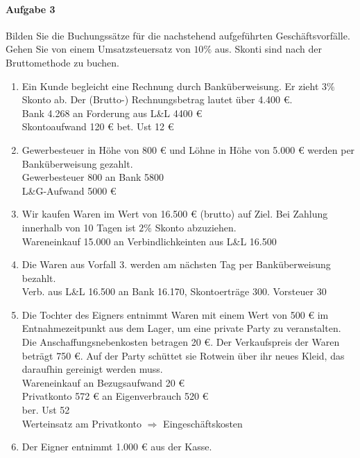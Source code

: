 \documentclass[paper=a4, fontsize=11pt]{scrartcl}
\numberwithin{equation}{section}
\numberwithin{figure}{section}
\numberwithin{table}{section}
\begin{document}
\paragraph{Aufgabe 3}
Bilden Sie die Buchungssätze für die nachstehend aufgeführten Geschäftsvorfälle. Gehen Sie von einem Umsatzsteuersatz von $10 \%$ aus. Skonti sind nach der Bruttomethode zu buchen. \\
\begin{enumerate}
\item Ein Kunde begleicht eine Rechnung durch Banküberweisung. Er zieht $3 \%$ Skonto ab. Der  (Brutto-) Rechnungsbetrag lautet über 4.400 €. \\

Bank 4.268 an Forderung aus L\&L 4400 € \\
Skontoaufwand 120 €
bet. Ust 12 €
\item Gewerbesteuer in Höhe von 800 € und Löhne in Höhe von 5.000 € werden per Banküberweisung gezahlt. \\

Gewerbesteuer 800 an Bank 5800 \\
L\&G-Aufwand 5000 €
\item Wir kaufen Waren im Wert von 16.500 € (brutto) auf Ziel. Bei Zahlung innerhalb von 10 Tagen ist $2\%$ Skonto abzuziehen. \\

Wareneinkauf 15.000 an Verbindlichkeinten aus L\&L 16.500
\item Die Waren aus Vorfall 3. werden am nächsten Tag per Banküberweisung bezahlt. \\

Verb. aus L\&L 16.500 an Bank 16.170, Skontoerträge 300. Vorsteuer 30
\item Die Tochter des Eigners entnimmt Waren mit einem Wert von 500 € im Entnahmezeitpunkt aus dem Lager, um eine private Party zu veranstalten. Die Anschaffungsnebenkosten betragen 20 €. Der Verkaufspreis der Waren beträgt 750 €. Auf der Party schüttet sie Rotwein über ihr neues Kleid, das daraufhin gereinigt werden muss. \\

Wareneinkauf an Bezugsaufwand 20 € \\
Privatkonto 572 € an Eigenverbrauch 520 € \\
ber. Ust 52 \\
Werteinsatz am Privatkonto $\Rightarrow$ Eingeschäftskosten
\item Der Eigner entnimmt 1.000 € aus der Kasse. \\


\end{enumerate}
\end{document}
